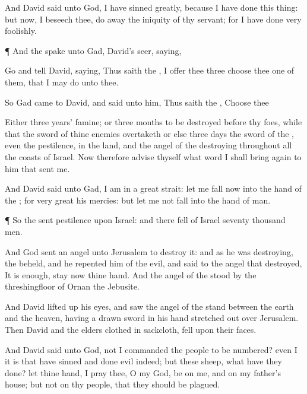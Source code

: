 {And
David
said unto
God, I have
sinned
greatly, because I have
done this
thing: but now, I beseech thee, do
away the
iniquity of thy
servant; for I have done
very
foolishly.


\par }{\PP {}¶ And the
{}
spake unto
Gad,
David’s
seer,
saying,

Go and
tell
David,
saying, Thus
saith the
{}, I
offer thee
three
{}
choose thee
one of
them, that I may
do
{} unto thee.

So
Gad
came to
David, and
said unto him, Thus
saith the
{},
Choose thee

Either
three
years’
famine; or
three
months to be
destroyed
before thy
foes, while that the
sword of thine
enemies
overtaketh
{}
or else
three
days the
sword of the
{}, even the
pestilence, in the
land, and the
angel of the
{}
destroying throughout all the
coasts of
Israel. Now therefore
advise thyself what
word I shall bring
again to him that
sent me.

And
David
said unto
Gad, I am in a
great
strait: let me
fall now into the
hand of the
{}; for
very
great
{} his
mercies: but let me not
fall into the
hand of
man.


\par }{\PP {}¶ So the
{}
sent
pestilence upon
Israel: and there
fell of
Israel
seventy
thousand
men.

And
God
sent an
angel unto
Jerusalem to
destroy it: and as he was
destroying, the
{}
beheld, and he
repented him of the
evil, and
said to the
angel that
destroyed, It is
enough,
stay now thine
hand. And the
angel of the
{}
stood by the
threshingfloor of
Ornan the
Jebusite.

And
David lifted
up his
eyes, and
saw the
angel of the
{}
stand between the
earth and the
heaven, having a
drawn
sword in his
hand stretched
out over
Jerusalem. Then
David and the
elders
{}
clothed in
sackcloth,
fell upon their
faces.

And
David
said unto
God,
{} not I
{}
commanded the
people to be
numbered? even I it is that have
sinned and done
evil
indeed; but
{} these
sheep, what have they
done? let thine
hand, I pray thee, O
{} my
God, be on me, and on my
father’s
house; but not on thy
people, that they should be
plagued.


}
